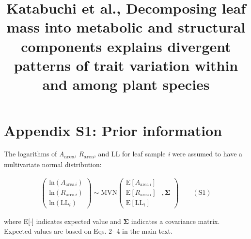 \documentclass[
  12pt,
  letterpaper,
  DIV=11,
  numbers=noendperiod]{scrartcl}
\title{Katabuchi et al., Decomposing leaf mass into metabolic and
structural components explains divergent patterns of trait variation
within and among plant species}
\author{}
\date{}
\renewcommand*\contentsname{Table of contents}
\newcommand\contentsname{Table of contents}
\begin{document}
\maketitle
\ifdefined\Shaded\renewenvironment{Shaded}{\begin{tcolorbox}[sharp corners, borderline west={3pt}{0pt}{shadecolor}, frame hidden, enhanced, breakable, boxrule=0pt, interior hidden]}{\end{tcolorbox}}\fi

\renewcommand*\contentsname{Table of contents}
{
\hypersetup{linkcolor=}
\setcounter{tocdepth}{3}
\tableofcontents
}
\newpage

\hypertarget{appendix-s1-prior-information}{%
\section{Appendix S1: Prior
information}\label{appendix-s1-prior-information}}

The logarithms of \emph{A}\textsubscript{area},
\emph{R}\textsubscript{area}, and LL for leaf sample \emph{i} were
assumed to have a multivariate normal distribution:

\[
\begin{aligned}
\left(
\begin{array}{ccc}
\mathrm{ln}(A_{\mathrm{area} \, i})\\
\mathrm{ln}(R_{\mathrm{area} \, i}) \\
\mathrm{ln}(\mathrm{LL}_i)
\end{array}
\right)
\sim \mathrm{MVN}
\left(
\begin{array}{rrr}
\mathrm{E}[A_{\mathrm{area} \, i}] & \\
\mathrm{E}[R_{\mathrm{area} \, i}] &, \boldsymbol{\Sigma}\\
\mathrm{E}[\mathrm{LL}_i] &
\end{array}
\right) \qquad(\mathrm{S}1)
\end{aligned}
\]

where E{[}\(\cdot\){]} indicates expected value and
\(\boldsymbol{\Sigma}\) indicates a covariance matrix. Expected values
are based on Eqs. 2- 4 in the main text.
\end{document}
